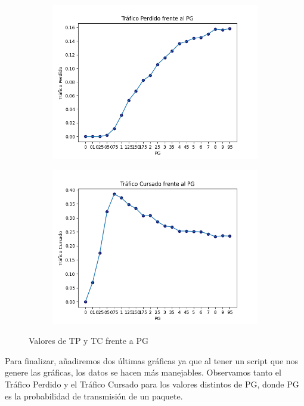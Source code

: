 \documentclass{article}
\begin{document}
\begin{figure}[h]
	\centering
	\begin{subfigure}{0.5\textwidth}
		\includegraphics[width=\linewidth]{src/TPvsPG.png}
		\caption{}
		\label{fig:TPvsPG}
	\end{subfigure}%
	\begin{subfigure}{0.5\textwidth}
		\includegraphics[width=\linewidth]{src/TCvsPG.png}
		\caption{}
		\label{fig:TCvsPG}
	\end{subfigure}
	\caption{Valores de TP y TC frente a PG}
	\label{fig:PGgraficas}
\end{figure}

Para finalizar, añadiremos dos últimas gráficas ya que al tener un script que nos genere las gráficas, los datos se hacen más manejables. Observamos tanto el Tráfico Perdido y el Tráfico Cursado para los valores distintos de PG, donde PG es la probabilidad de transmisión de un paquete. 
\end{document}
